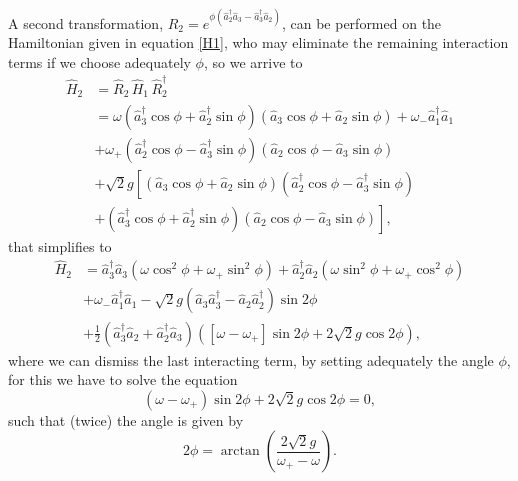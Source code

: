 \documentclass{article}
\newcommand{\op}[1]{\hat{#1}}
\begin{document}
A second transformation, $\op{R}_{2}=e^{\phi\left(\op{a}_{2}^{\dagger}\op{a}_{3} - \op{a}_{3}^{\dagger}\op{a}_2\right)}$, can be performed on the Hamiltonian given in equation \eqref{H1}, who may eliminate the remaining interaction terms if we choose adequately $\phi$, so we arrive to
\begin{align*}
    \op{H}_{2} &= \op{R}_{2}\, \op{H}_{1}\, \op{R}_{2}^{\dagger}\\ 
    &= \omega\left(\op{a}_{3}^{\dagger}\cos\phi + \op{a}_{2}^{\dagger}\sin\phi\right)\left(\op{a}_{3}\cos\phi + \op{a}_{2}\sin\phi\right) + \omega_{-}\op{a}_{1}^{\dagger}\op{a}_{1}\\ 
    &+ \omega_{+}\left(\op{a}_{2}^{\dagger}\cos\phi - \op{a}_{3}^{\dagger}\sin\phi\right)\left(\op{a}_{2}\cos\phi - \op{a}_{3}\sin\phi\right)\\ 
    &+ \sqrt{2} g\left[\left(\op{a}_{3}\cos\phi + \op{a}_{2}\sin\phi\right)\left(\op{a}_{2}^{\dagger}\cos\phi - \op{a}_{3}^{\dagger}\sin\phi\right)\right.\\
    &+ \left.\left(\op{a}_{3}^{\dagger}\cos\phi + \op{a}_{2}^{\dagger}\sin\phi\right)\left(\op{a}_{2}\cos\phi-\op{a}_{3}\sin\phi\right)\right],
\end{align*}
that simplifies to
\begin{equation}\label{H2}
\begin{aligned}
    \op{H}_{2} &= \op{a}_{3}^{\dagger}\op{a}_{3}(\omega\cos^{2}\phi+\omega_{+}\sin^{2}\phi)+\op{a}_{2}^{\dagger}\op{a}_{2}(\omega\sin^{2}\phi+\omega_{+}\cos^{2}\phi)\\
    &+\omega_{-}\op{a}_{1}^{\dagger}\op{a}_{1}-\sqrt{2}g(\op{a}_{3}\op{a}_{3}^{\dagger}-\op{a}_{2}\op{a}_{2}^{\dagger})\sin2\phi\\
    &+\frac{1}{2}(\op{a}_{3}^{\dagger}\op{a}_{2}+\op{a}_{2}^{\dagger}\op{a}_{3})\left([\omega-\omega_{+}]\sin2\phi+2\sqrt{2}g\cos2\phi\right),
\end{aligned}
\end{equation}
where we can dismiss the last interacting term, by setting adequately the angle $\phi$, for this we have to solve the equation
\begin{equation*}
    (\omega-\omega_{+})\sin2\phi+2\sqrt{2}g\cos2\phi=0,
\end{equation*}
such that (twice) the angle is given by
\begin{equation*}
    2\phi = \arctan\left(\frac{2\sqrt{2}g}{\omega_{+}-\omega}\right).
\end{equation*}
\end{document}
